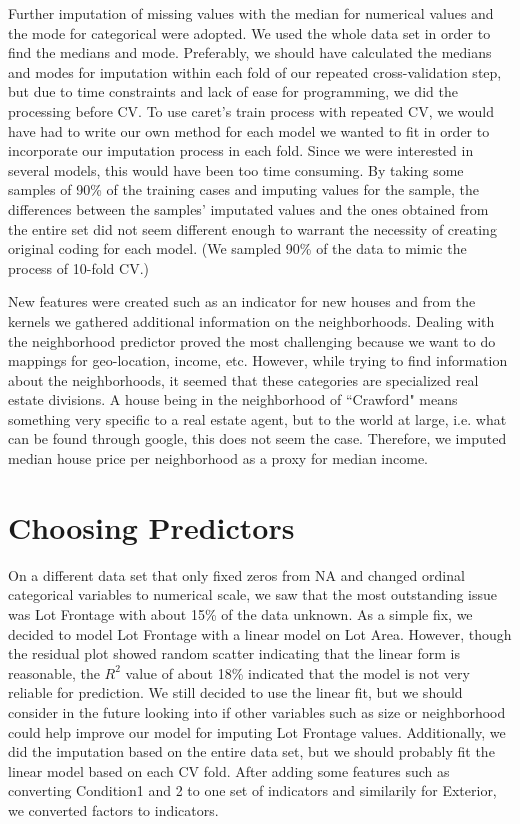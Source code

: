 \documentclass[12pt]{article}
\begin{document}
Further imputation of missing values with the median for numerical values and the mode for categorical were adopted.  We used the whole data set in order to find the medians and mode.  Preferably, we should have calculated the medians and modes for imputation within each fold of our repeated cross-validation step, but due to time constraints and lack of ease for programming, we did the processing before CV.  To use caret's train process with repeated CV, we would have had to write our own method for each model we wanted to fit in order to incorporate our imputation process in each fold.  Since we were interested in several models, this would have been too time consuming.  By taking some samples of 90\% of the training cases and imputing values for the sample, the differences between the samples' imputated values and the ones obtained from the entire set did not seem different enough to warrant the necessity of creating original coding for each model.  (We sampled 90\% of the data to mimic the process of 10-fold CV.)

New features were created such as an indicator for new houses and from the kernels we gathered additional information on the neighborhoods.  Dealing with the neighborhood predictor proved the most challenging because we want to do mappings for geo-location, income, etc.  However, while trying to find information about the neighborhoods, it seemed that these categories are specialized real estate divisions.  A house being in the neighborhood of ``Crawford" means something very specific to a real estate agent, but to the world at large, i.e. what can be found through google, this does not seem the case.  Therefore, we imputed median house price per neighborhood as a proxy for median income.


\section{Choosing Predictors}

On a different data set that only fixed zeros from NA and changed ordinal categorical variables to numerical scale, we saw that the most outstanding issue was Lot Frontage with about 15\% of the data unknown.  As a simple fix, we decided to model Lot Frontage with a linear model on Lot Area.  However, though the residual plot showed random scatter indicating that the linear form is reasonable, the $R^2$ value of about 18\% indicated that the model is not very reliable for prediction.  We still decided to use the linear fit, but we should consider in the future looking into if other variables such as size or neighborhood could help improve our model for imputing Lot Frontage values.  Additionally, we did the imputation based on the entire data set, but we should probably fit the linear model based on each CV fold.  After adding some features such as converting Condition1 and 2 to one set of indicators and similarily for Exterior, we converted factors to indicators.
\end{document}
